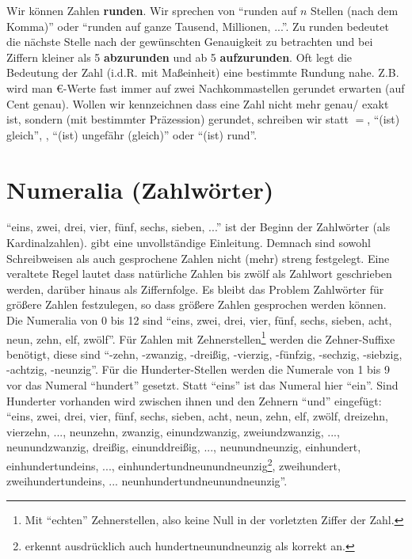 \documentclass[a4paper]{book}%
\theoremstyle{definition}
\begin{document}
Wir können Zahlen \textbf{runden}. Wir sprechen von \enquote{runden auf $n$ Stellen (nach dem Komma)} oder \enquote{runden auf ganze Tausend, Millionen, ...}. Zu runden bedeutet die nächste Stelle nach der gewünschten Genauigkeit zu betrachten und bei Ziffern kleiner als 5 \textbf{abzurunden} und ab 5 \textbf{aufzurunden}. Oft legt die Bedeutung der Zahl (i.d.R. mit Maßeinheit) eine bestimmte Rundung nahe. Z.B. wird man €-Werte fast immer auf zwei Nachkommastellen gerundet erwarten (auf Cent genau). Wollen wir kennzeichnen dass eine Zahl nicht mehr genau/ exakt ist, sondern (mit bestimmter Präzession) gerundet, schreiben wir statt $=$, \enquote{(ist) gleich}, , \enquote{(ist) ungefähr (gleich)} oder \enquote{(ist) rund}.


\section{Numeralia (Zahlwörter)}\label{numeralia}

\enquote{eins, zwei, drei, vier, fünf, sechs, sieben, ...} ist der Beginn der Zahlwörter (als Kardinalzahlen). \citep[Randzahl 509]{DudenGrammatik2016} gibt eine unvollständige Einleitung. Demnach sind sowohl Schreibweisen als auch gesprochene Zahlen nicht (mehr) streng festgelegt. Eine veraltete Regel lautet dass natürliche Zahlen bis zwölf als Zahlwort geschrieben werden, darüber hinaus als Ziffernfolge. Es bleibt das Problem Zahlwörter für größere Zahlen festzulegen, so dass größere Zahlen gesprochen werden können. Die Numeralia von 0 bis 12 sind \enquote{eins, zwei, drei, vier, fünf, sechs, sieben, acht, neun, zehn, elf, zwölf}. Für Zahlen mit Zehnerstellen\footnote{Mit \enquote{echten} Zehnerstellen, also keine Null in der vorletzten Ziffer der Zahl.} werden die Zehner-Suffixe benötigt, diese sind \enquote{-zehn, -zwanzig, -dreißig, -vierzig, -fünfzig, -sechzig, -siebzig, -achtzig, -neunzig}. Für die Hunderter-Stellen werden die Numerale von 1 bis 9 vor das Numeral \enquote{hundert} gesetzt. Statt \enquote{eins} ist das Numeral hier \enquote{ein}. Sind Hunderter vorhanden wird zwischen ihnen und den Zehnern \enquote{und} eingefügt: \enquote{eins, zwei, drei, vier, fünf, sechs, sieben, acht, neun, zehn, elf, zwölf, dreizehn, vierzehn, ..., neunzehn, zwanzig, einundzwanzig, zweiundzwanzig, ..., neunundzwanzig, dreißig, einunddreißig, ..., neunundneunzig, einhundert, einhundertundeins, ..., einhundertundneunundneunzig\footnote{\cite{DudenGrammatik2016} erkennt ausdrücklich auch hundertneunundneunzig als korrekt an.}, zweihundert, zweihundertundeins, ... neunhundertundneunundneunzig}.
\end{document}
